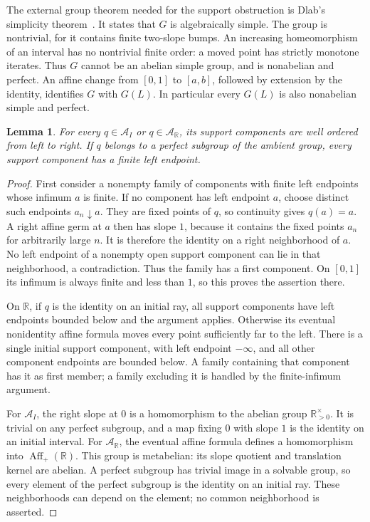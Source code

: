 \documentclass[10pt]{article}
\newtheorem{lemma}[theorem]{Lemma}
\theoremstyle{definition}
\newcommand{\R}{\mathbb R}
\newcommand{\Aff}{\operatorname{Aff}}
\newcommand{\AI}{\mathcal A_I}
\newcommand{\AR}{\mathcal A_{\R}}
\begin{document}
The external group theorem needed for the support obstruction is Dlab's
simplicity theorem~\cite[Theorem~4.3]{Dlab}. It states that $G$ is
algebraically simple. The group is nontrivial, for it contains finite
two-slope bumps. An increasing homeomorphism of an interval has no
nontrivial finite order: a moved point has strictly monotone iterates.
Thus $G$ cannot be an abelian simple group, and is nonabelian and
perfect. An affine change from $[0,1]$ to $[a,b]$, followed by extension
by the identity, identifies $G$ with $G(L)$. In particular every $G(L)$
is also nonabelian simple and perfect.

\begin{lemma}\label{lem:wellordered}
For every $q\in\AI$ or $q\in\AR$, its support components are
well ordered from left to right. If $q$ belongs to a perfect subgroup
of the ambient group, every support component has a finite left endpoint.
\end{lemma}

\begin{proof}
First consider a nonempty family of components with finite left
endpoints whose infimum $a$ is finite. If no component has left endpoint
$a$, choose distinct such endpoints $a_n\downarrow a$. They are fixed
points of $q$, so continuity gives $q(a)=a$. A right affine germ at $a$
then has slope $1$, because it contains the fixed points $a_n$ for
arbitrarily large $n$. It is therefore the identity on a right
neighborhood of $a$. No left endpoint of a nonempty open support
component can lie in that neighborhood, a contradiction. Thus the
family has a first component. On $[0,1]$ its infimum is always finite
and less than $1$, so this proves the assertion there.

On $\R$, if $q$ is the identity on an initial ray, all support components
have left endpoints bounded below and the argument applies. Otherwise
its eventual nonidentity affine formula moves every point sufficiently
far to the left. There is a single initial support component, with left
endpoint $-\infty$, and all other component endpoints are bounded
below. A family containing that component has it as first member; a
family excluding it is handled by the finite-infimum argument.

For $\AI$, the right slope at $0$ is a homomorphism to the abelian
group $\R_{>0}^{\times}$. It is trivial on any perfect subgroup, and a
map fixing $0$ with slope $1$ is the identity on an initial interval.
For $\AR$, the eventual affine formula defines a homomorphism into
$\Aff_+(\R)$. This group is metabelian: its slope quotient and
translation kernel are abelian. A perfect subgroup has trivial image
in a solvable group, so every element of the perfect subgroup is the
identity on an initial ray. These neighborhoods can depend on the
element; no common neighborhood is asserted.
\end{proof}
\end{document}
